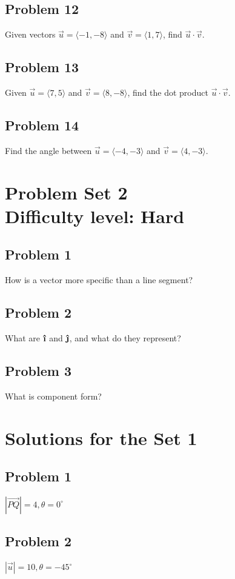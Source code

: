 \documentclass[12pt]{article}
\newcommand{\ihat}{\boldsymbol{\hat{\textbf{\i}}}}
\newcommand{\jhat}{\boldsymbol{\hat{\textbf{\j}}}}
\begin{document}
\subsection*{Problem 12}
Given vectors \( \vec{u} = \langle -1, -8 \rangle \) and \( \vec{v} = \langle 1, 7 \rangle \), find \( \vec{u} \cdot \vec{v} \).

\subsection*{Problem 13}
Given \( \vec{u} = \langle 7, 5 \rangle \) and \( \vec{v} = \langle 8, -8 \rangle \), find the dot product \( \vec{u} \cdot \vec{v} \).

\subsection*{Problem 14}
Find the angle between \( \vec{u} = \langle -4, -3 \rangle \) and \( \vec{v} = \langle 4, -3 \rangle \).

\section*{Problem Set 2\\Difficulty level: Hard}
\subsection*{Problem 1}
How is a vector more specific than a line segment?

\subsection*{Problem 2}
What are \(\ihat\) and \(\jhat\), and what do they represent?

\subsection*{Problem 3}
What is component form?

\newpage
\section*{Solutions for the Set 1}
\subsection*{Problem 1}
\( |\overrightarrow{PQ}|=4, \theta =0^{\circ}\)
\subsection*{Problem 2}
\(|\vec{u}|=10,\theta=-45^{\circ}\)
\end{document}
